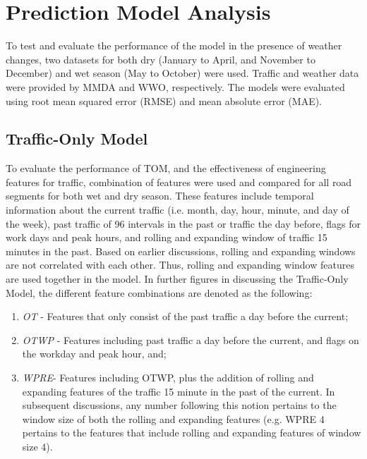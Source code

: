 \section{Prediction Model Analysis}
To test and evaluate the performance of the model in the presence of weather changes, two datasets for both dry (January to April, and November to December) and wet season (May to October) were used. Traffic and weather data were provided by MMDA and WWO, respectively. The models were evaluated using root mean squared error (RMSE) and mean absolute error (MAE). 


\subsection{Traffic-Only Model}
To evaluate the performance of TOM, and the effectiveness of engineering features for traffic, combination of features were used and compared for all road segments for both wet and dry season. These features include temporal information about the current traffic (i.e. month, day, hour, minute, and day of the week), past traffic of 96 intervals in the past or traffic the day before, flags for work days and peak hours, and rolling and expanding window of traffic 15 minutes in the past. Based on earlier discussions, rolling and expanding windows are not correlated with each other. Thus, rolling and expanding window features are used together in the model. In further figures in discussing the Traffic-Only Model, the different feature combinations are denoted as the following:

\begin{enumerate}
\item \textit{OT} - Features that only consist of the past traffic a day before the current;
\item \textit{OTWP} - Features including past traffic a day before the current, and flags on the workday and peak hour, and;
\item \textit{WPRE}- Features including OTWP, plus the addition of rolling and expanding features of the traffic 15 minute in the past of the current. In subsequent discussions, any number following this notion pertains to the window size of both the rolling and expanding features (e.g. WPRE 4 pertains to the features that include rolling and expanding features of window size 4).
\end{enumerate}

